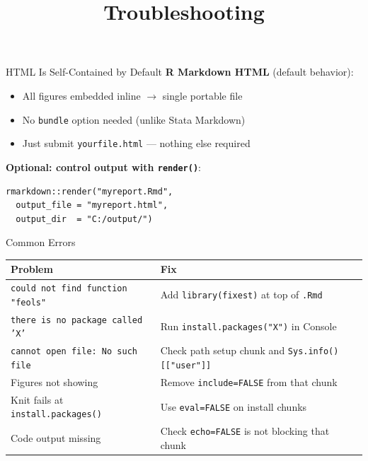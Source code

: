 \documentclass[dvipsnames,hyperref={pdfpagelabels=false}]{beamer}
\begin{document}
\begin{frame}[fragile]{HTML Is Self-Contained by Default}
  \textbf{R Markdown HTML} (default behavior):
  \begin{itemize}
    \item All figures embedded inline $\to$ single portable file
    \item No \texttt{bundle} option needed (unlike Stata Markdown)
    \item Just submit \texttt{yourfile.html} --- nothing else required
  \end{itemize}

  \vspace{0.8em}
  \textbf{Optional: control output with \texttt{render()}}:
  \begin{lstlisting}[style=rslide]
rmarkdown::render("myreport.Rmd",
  output_file = "myreport.html",
  output_dir  = "C:/output/")
  \end{lstlisting}
\end{frame}

\title[]{Troubleshooting}
\author{}\institute{}\date{}
\begin{frame}{}
  \titlepage
\end{frame}

\begin{frame}{Common Errors}
  \small
  \begin{center}
    \begin{tabular}{ll}
      \toprule
      \textbf{Problem} & \textbf{Fix} \\
      \midrule
      \texttt{could not find function "feols"} & Add \texttt{library(fixest)} at top of \texttt{.Rmd} \\
      \texttt{there is no package called 'X'}  & Run \texttt{install.packages("X")} in Console \\
      \texttt{cannot open file: No such file}  & Check path setup chunk and \texttt{Sys.info()[["user"]]} \\
      Figures not showing                      & Remove \texttt{include=FALSE} from that chunk \\
      Knit fails at \texttt{install.packages()} & Use \texttt{eval=FALSE} on install chunks \\
      Code output missing                      & Check \texttt{echo=FALSE} is not blocking that chunk \\
      \bottomrule
    \end{tabular}
  \end{center}
\end{frame}
\end{document}
